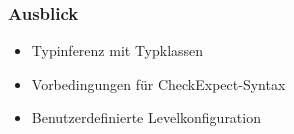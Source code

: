 \documentclass{beamer}
\begin{document}
\begin{frame}
	\frametitle{Ausblick}
	\begin{itemize}[<+->]
		\item{Typinferenz mit Typklassen}
		\item{Vorbedingungen für CheckExpect-Syntax}
		\item{Benutzerdefinierte Levelkonfiguration}
	\end{itemize}
\end{frame}
\end{document}
